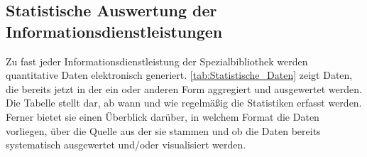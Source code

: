 \subsection{Statistische Auswertung der Informationsdienstleistungen}

Zu fast jeder Informationsdienstleistung der Spezialbibliothek werden quantitative Daten elektronisch generiert. 
\autoref{tab:Statistische_Daten} zeigt Daten, die bereits jetzt in der ein oder anderen Form aggregiert und ausgewertet werden. 
Die Tabelle stellt dar, ab wann und wie regelmäßig die Statistiken erfasst werden. Ferner bietet sie einen Überblick darüber, in welchem 
Format die Daten vorliegen, über die Quelle aus der sie stammen und ob die Daten bereits systematisch ausgewertet und/oder visualisiert werden.


\begingroup
\setlength{\tabcolsep}{4pt} %
\renewcommand{\arraystretch}{1.5}
